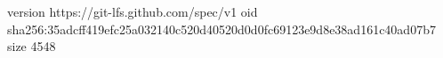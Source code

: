 version https://git-lfs.github.com/spec/v1
oid sha256:35adcff419efc25a032140c520d40520d0d0fc69123e9d8e38ad161c40ad07b7
size 4548
